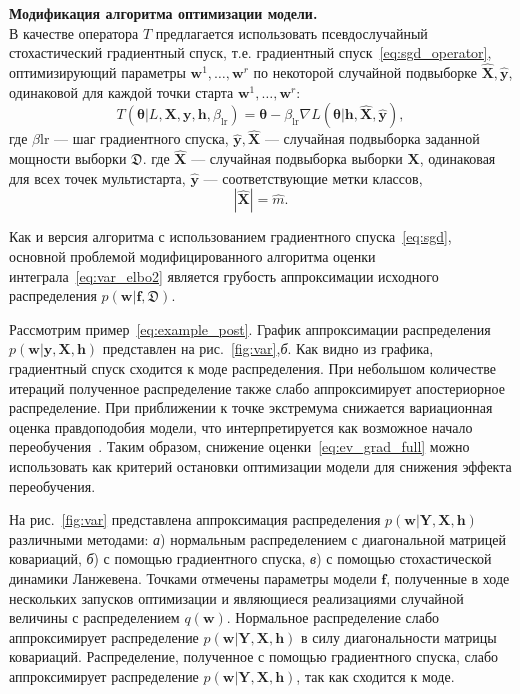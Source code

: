 \textbf{Модификация алгоритма оптимизации модели.} \\
В качестве оператора $T$ предлагается использовать псевдослучайный стохастический градиентный спуск, т.е. градиентный спуск~\eqref{eq:sgd_operator}, оптимизирующий параметры $\mathbf{w}^1,\dots,\mathbf{w}^r$ по некоторой случайной подвыборке $\hat{\mathbf{X}}, \hat{\mathbf{y}}$, одинаковой для каждой точки старта $\mathbf{w}^1,\dots,\mathbf{w}^r$:
\[
    T( \boldsymbol{\theta}| L,\mathbf{X},  \mathbf{y},  \mathbf{h}, {\beta_{\text{lr}}}) = \boldsymbol{\theta} - \beta_{\text{lr}}\nabla L(\boldsymbol{\theta}|   \mathbf{h},  \hat{\mathbf{X}}, \hat{\mathbf{y}}),
\]
где $\beta{\text{lr}}$ --- шаг градиентного спуска, $\hat{\mathbf{y}}, \hat{\mathbf{X}}$ --- случайная подвыборка заданной мощности выборки $\mathfrak{D}$.
где $\hat{\mathbf{X}}$ --- случайная подвыборка выборки ${\mathbf{X}}$, одинаковая для всех точек мультистарта, $\hat{\mathbf{y}}$ --- соответствующие метки классов, $$|\hat{\mathbf{X}}| = \hat{m}.$$

Как и версия алгоритма с использованием градиентного спуска~\eqref{eq:sgd}, основной проблемой модифицированного алгоритма оценки интеграла~\eqref{eq:var_elbo2} является грубость аппроксимации исходного распределения $p(\mathbf{w}|\mathbf{f},\mathfrak{D})$.

Рассмотрим пример~\eqref{eq:example_post}.
График аппроксимации распределения $p(\mathbf{w}|\mathbf{y}, \mathbf{X}, \mathbf{h})$ представлен на рис.~\ref{fig:var},\textit{б}.
Как видно из графика, градиентный спуск сходится к моде распределения. При небольшом количестве итераций полученное распределение также слабо аппроксимирует апостериорное распределение. {При приближении к точке экстремума снижается вариационная оценка правдоподобия модели, что  интерпретируется как возможное начало переобучения~\cite{early}. Таким образом, снижение оценки~\eqref{eq:ev_grad_full} можно использовать как критерий остановки оптимизации модели для снижения эффекта переобучения.  }

На рис.~\ref{fig:var} представлена  {аппроксимация распределения $p(\mathbf{w}|\mathbf{Y}, \mathbf{X}, \mathbf{h})$ различными методами: \textit{а}) нормальным распределением с диагональной матрицей ковариаций, \textit{б}) с помощью градиентного спуска, \textit{в}) с помощью стохастической динамики Ланжевена. Точками отмечены параметры модели $\mathbf{f}$, полученные в ходе нескольких запусков оптимизации и являющиеся реализациями случайной величины с распределением $q(\mathbf{w})$. Нормальное распределение слабо аппроксимирует распределение $p(\mathbf{w}|\mathbf{Y}, \mathbf{X}, \mathbf{h})$ в силу диагональности матрицы ковариаций. Распределение, полученное с помощью градиентного спуска, слабо аппроксимирует распределение $p(\mathbf{w}|\mathbf{Y}, \mathbf{X}, \mathbf{h})$, так как сходится к моде.}





